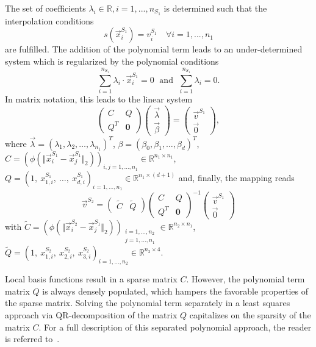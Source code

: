 The set of coefficients $\lambda_{i} \in \mathbb{R}, i=1,...,n_{S_1}$ is determined such that the interpolation conditions
%
\[
s \left( \vec{x}_{i}^{S_1} \right) = v_{i}^{S_1} \quad \forall i = 1,...,n_1 
\]
%
are fulfilled. The addition of the polynomial term leads to an under-determined system which is regularized by the polynomial conditions
%
\[
\sum\limits_{i=1}^{n_{S_1}} \lambda_{i} \cdot \vec{x}_{i}^{S_1} = 0 \; \mbox{ and } \; \sum\limits_{i=1}^{n_{S_1}} \lambda_{i} = 0.
\]
In matrix notation, this leads to the linear system
%
\[ \left( \begin{array}{cc} C & Q \\ Q^T & \mathbf{0} \end{array} \right) 
   \left( \begin{array}{c} \vec{\lambda} \\ \vec{\beta} \end{array} \right) = 
   \left( \begin{array}{c} \vec{v}^{S_1} \\ \vec{0} \end{array} \right), \]
% 
where $\vec{\lambda} = \left( \lambda_1, \lambda_2, \ldots, \lambda_{n_1} \right)^T$, $\beta = \left(\beta_0, \beta_1, \ldots, \beta_d\right)^T$, $C = \left( \phi \left( \Vert \vec{x}_{i}^{S_1} - \vec{x}_{j}^{S_1} \Vert_{2} \right) \right)_{i,j = 1, \ldots, n_1} \in \mathbb{R}^{n_1 \times n_1}$, $Q = \left( 1,\ x_{1,i}^{S_1},\ \ldots,\ x_{d,i}^{S_1} \right)_{i=1,\ldots,n_1} \in \mathbb{R}^{n_1 \times (d+1)}$
%
and, finally, the mapping reads
\[ \vec{v}^{S_2}  = \left( \begin{array}{cc} \tilde{C} & \tilde{Q} \end{array} \right) \left( \begin{array}{cc} C & Q \\ Q^T & \mathbf{0} \end{array} \right)^{-1} \left( \begin{array}{c} \vec{v}^{S_1} \\ \vec{0} \end{array} \right) \] 
with $\tilde{C} = \left( \phi \left( \Vert \vec{x}_{i}^{S_2} - \vec{x}_{j}^{S_1} \Vert_{2} \right)\right)_{\substack{i=1,\ldots, n_2 \\ j=1,\ldots,n_1}} \in \mathbb{R}^{n_2 \times n_1}$, 
$\tilde{Q} = \left( 1,\ x_{1,i}^{S_2},\ x_{2,i}^{S_2},\ x_{3,i}^{S_2} \right)_{i=1,\ldots,n_2} \in \mathbb{R}^{n_2 \times 4}$.

Local basis functions result in a sparse matrix $C$. 
However, the polynomial term matrix $Q$ is always densely populated, which hampers the favorable properties of the sparse matrix. Solving the polynomial term separately in a least squares approach via QR-decomposition of the matrix $Q$ capitalizes on the sparsity of the matrix $C$. For a full description of this separated polynomial approach, the reader is referred to~\cite{Lindner2017}.


